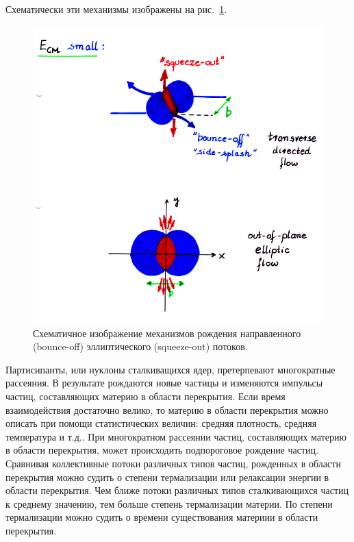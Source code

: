 Схематически эти механизмы изображены на рис.~\ref{fig:bounce_off}.
%
\begin{figure}[ht]
\begin{center}
    \includegraphics[width=0.75\linewidth]{images/bounce_off.jpg}
    \caption{Схематичное изображение механизмов рождения направленного (bounce-off) эллиптического (squeeze-out) потоков.}
    \label{fig:bounce_off}
\end{center}
\end{figure}
%

Партисипанты, или нуклоны сталкиващихся ядер, претерпевают многократные рассеяния.
В результате рождаются новые частицы и изменяются импульсы частиц, составляющих материю в области перекрытия.
Если время взаимодействия достаточно велико, то материю в области перекрытия можно описать при помощи статистических величин: средняя плотность, средняя температура и т.д..
При многократном рассеянии частиц, составляющих материю в области перекрытия, может происходить подпороговое рождение частиц.
Сравнивая коллективные потоки различных типов частиц, рожденных в области перекрытия можно судить о степени термализации или релаксации энергии в области перекрытия.
Чем ближе потоки различных типов сталкивающихся частиц к среднему значению, тем больше степень термализации материи.
По степени термализации можно судить о времени существования материии в области перекрытия.  

